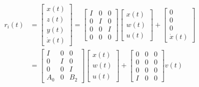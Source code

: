 \documentclass[twocolumn]{autart}    %
\begin{document}
\begin{pf}
    
    \begin{equation}
        \begin{aligned}
            r_{i}(t) &= \begin{bmatrix}
                x(t) \\
                z(t) \\
                y(t) \\
                \dot{x}(t)
            \end{bmatrix} = \begin{bmatrix}
                I & 0 & 0 \\
                0 & I & 0  \\
                0 & 0 & I  \\
                0 & 0 & 0 
            \end{bmatrix}\begin{bmatrix}
                x(t) \\
                w(t) \\
                u(t) 
            \end{bmatrix}+\begin{bmatrix}
                0 \\
                0 \\
                0 \\
                \dot{x}(t)
            \end{bmatrix}\\
            &= \begin{bmatrix}
                I & 0 & 0 \\
                0 & I & 0  \\
                0 & 0 & I  \\
                A_{0} & 0 & B_{2} 
            \end{bmatrix}\begin{bmatrix}
                x(t) \\
                w(t) \\
                u(t) 
            \end{bmatrix}+\begin{bmatrix}
                0 & 0 & 0 \\
                0 & 0 & 0\\
                0 & 0 & 0\\
                I & 0 & 0
            \end{bmatrix}v(t)
        \end{aligned}
    \end{equation}
    

\end{pf}
\end{document}
